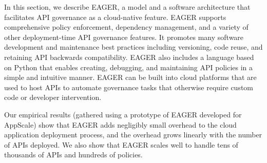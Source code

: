 In this section, we describe EAGER, a model and a software architecture that 
facilitates API governance as a cloud-native feature. EAGER supports comprehensive policy
enforcement, dependency management, and a variety of other deployment-time API
governance features. It promotes many software development and maintenance
best practices including versioning, code reuse, and retaining API backwards
compatibility. EAGER also includes a language based on Python that enables
creating, debugging, and maintaining API policies in a simple and intuitive
manner. EAGER can be built into cloud platforms that are used to host APIs
to automate governance tasks that otherwise require custom code or developer intervention.

Our empirical results (gathered using a prototype of EAGER developed for AppScale)
show that EAGER adds negligibly small overhead to the cloud application 
deployment process, and the overhead grows linearly
with the number of APIs deployed. We also show that EAGER scales well 
to handle tens of thousands of APIs and hundreds of policies. 




